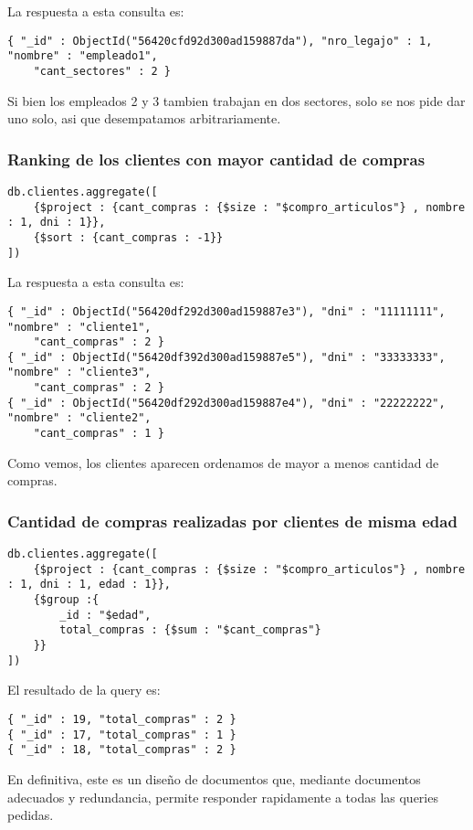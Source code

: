 La respuesta a esta consulta es:

\begin{verbatim}
{ "_id" : ObjectId("56420cfd92d300ad159887da"), "nro_legajo" : 1, "nombre" : "empleado1",
    "cant_sectores" : 2 }
\end{verbatim}

Si bien los empleados 2 y 3 tambien trabajan en dos sectores, solo se nos pide dar uno solo, asi que desempatamos arbitrariamente.

\subsubsection{Ranking de los clientes con mayor cantidad de compras}

\begin{verbatim}
db.clientes.aggregate([
    {$project : {cant_compras : {$size : "$compro_articulos"} , nombre : 1, dni : 1}},
    {$sort : {cant_compras : -1}}
])
\end{verbatim}

La respuesta a esta consulta es:

\begin{verbatim}
{ "_id" : ObjectId("56420df292d300ad159887e3"), "dni" : "11111111", "nombre" : "cliente1",
    "cant_compras" : 2 }
{ "_id" : ObjectId("56420df392d300ad159887e5"), "dni" : "33333333", "nombre" : "cliente3",
    "cant_compras" : 2 }
{ "_id" : ObjectId("56420df292d300ad159887e4"), "dni" : "22222222", "nombre" : "cliente2",
    "cant_compras" : 1 }
\end{verbatim}

Como vemos, los clientes aparecen ordenamos de mayor a menos cantidad de compras.

\subsubsection{Cantidad de compras realizadas por clientes de misma edad}

\begin{verbatim}
db.clientes.aggregate([
    {$project : {cant_compras : {$size : "$compro_articulos"} , nombre : 1, dni : 1, edad : 1}},
    {$group :{
        _id : "$edad",
        total_compras : {$sum : "$cant_compras"}
    }}
])
\end{verbatim}

El resultado de la query es:

\begin{verbatim}
{ "_id" : 19, "total_compras" : 2 }
{ "_id" : 17, "total_compras" : 1 }
{ "_id" : 18, "total_compras" : 2 }
\end{verbatim}

En definitiva, este es un diseño de documentos que, mediante documentos adecuados y redundancia, permite responder rapidamente a todas las queries pedidas.
